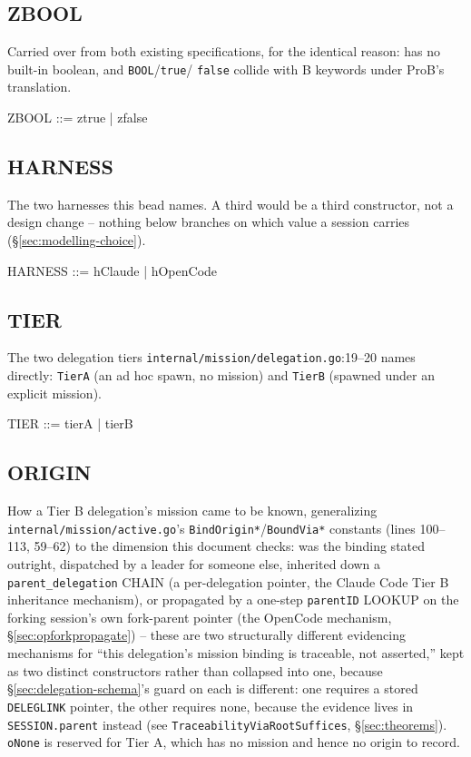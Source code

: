 \documentclass[a4paper,10pt,fleqn]{article}
\newcommand{\fpath}[1]{\texttt{#1}}
\newcommand{\field}[1]{\texttt{#1}}
\begin{document}
\subsection{ZBOOL}

Carried over from both existing specifications, for the identical
reason: \fuzz{} has no built-in boolean, and \field{BOOL}/\field{true}/
\field{false} collide with B keywords under ProB's translation.

\begin{zed}
ZBOOL ::= ztrue | zfalse
\end{zed}

\subsection{HARNESS}

The two harnesses this bead names. A third would be a third
constructor, not a design change -- nothing below branches on which
value a session carries (\S\ref{sec:modelling-choice}).

\begin{zed}
HARNESS ::= hClaude | hOpenCode
\end{zed}

\subsection{TIER}

The two delegation tiers \fpath{internal/mission/delegation.go}:19--20
names directly: \field{TierA} (an ad hoc spawn, no mission) and
\field{TierB} (spawned under an explicit mission).

\begin{zed}
TIER ::= tierA | tierB
\end{zed}

\subsection{ORIGIN}

How a Tier B delegation's mission came to be known, generalizing
\fpath{internal/mission/active.go}'s \field{BindOrigin*}/\field{BoundVia*}
constants (lines 100--113, 59--62) to the dimension this document
checks: was the binding stated outright, dispatched by a leader for
someone else, inherited down a \field{parent\_delegation} CHAIN (a
per-delegation pointer, the Claude Code Tier B inheritance mechanism),
or propagated by a one-step \field{parentID} LOOKUP on the forking
session's own fork-parent pointer (the OpenCode mechanism,
\S\ref{sec:opforkpropagate}) -- these are two structurally different
evidencing mechanisms for ``this delegation's mission binding is
traceable, not asserted,'' kept as two distinct constructors rather
than collapsed into one, because \S\ref{sec:delegation-schema}'s guard
on each is different: one requires a stored \field{DELEGLINK} pointer,
the other requires none, because the evidence lives in
\field{SESSION.parent} instead (see
\field{TraceabilityViaRootSuffices}, \S\ref{sec:theorems}).
\field{oNone} is reserved for Tier A, which has no mission and hence no
origin to record.
\end{document}
